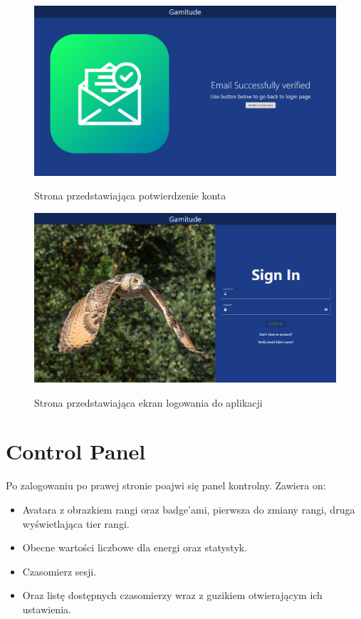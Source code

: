 \documentclass[a4paper,11pt]{report}
\begin{document}
\begin{figure}[H]
	\centering
	\includegraphics[scale=0.3]{prezentacja/Confirmed_Email}\\
	\caption{Strona przedstawiająca potwierdzenie konta}
	\label{fig:Confirmed_Email}
\end{figure}
\begin{figure}[H]
	\centering
	\includegraphics[scale=0.3]{prezentacja/Login}\\
	\caption{Strona przedstawiająca ekran logowania do aplikacji}
	\label{fig:Login}
\end{figure}
\section{Control Panel}
Po zalogowaniu po prawej stronie poajwi się panel kontrolny.
Zawiera on:
\begin{itemize}
	\item Avatara z obrazkiem rangi oraz badge'ami, pierwsza do zmiany rangi, druga wyświetlająca tier rangi. 
	\item Obecne wartości liczbowe dla energi oraz statystyk.
	\item Czasomierz sesji.
	\item Oraz listę dostępnych czasomierzy wraz z guzikiem otwierającym ich ustawienia.
\end{itemize}
\end{document}
